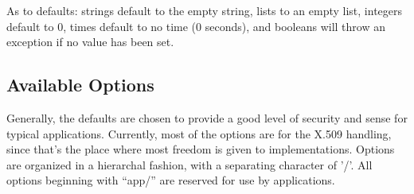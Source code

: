 \documentclass{article}
\begin{document}
As to defaults: strings default to the empty string, lists to an empty list,
integers default to 0, times default to no time (0 seconds), and booleans will
throw an exception if no value has been set.

\subsection{Available Options}

Generally, the defaults are chosen to provide a good level of security and
sense for typical applications. Currently, most of the options are for the
X.509 handling, since that's the place where most freedom is given to
implementations. Options are organized in a hierarchal fashion, with a
separating character of '/'. All options beginning with ``app/'' are reserved
for use by applications.

\newcommand{\confopt}[4]{
   \textbf{``#1''}, (\textbf{#2}, default \textbf{#3}): #4.
}
\end{document}
